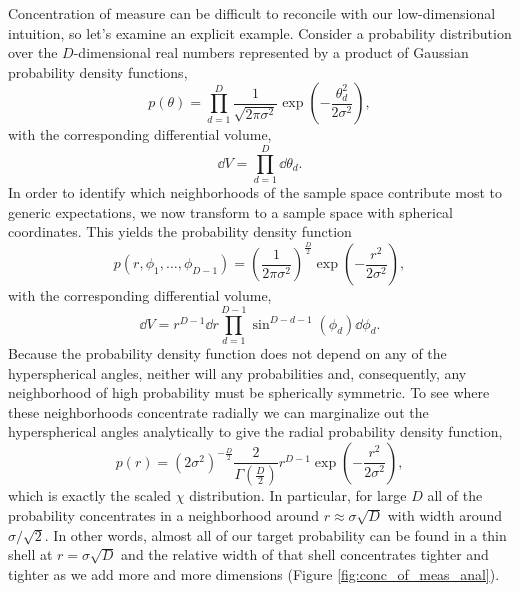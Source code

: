 Concentration of measure can be difficult to reconcile with our
low-dimensional intuition, so let's examine an explicit example.  Consider 
a probability distribution over the $D$-dimensional real numbers 
represented by a product of Gaussian probability density functions,
%
\begin{equation*}
p \! \left( \theta \right) = 
\prod_{d = 1}^{D} \frac{1}{\sqrt{2 \pi \sigma^{2} } }
\exp \! \left( - \frac{\theta_{d}^{2}}{2 \sigma^{2}} \right),
\end{equation*}
%
with the corresponding differential volume,
%
\begin{equation*}
\dd V = \prod_{d = 1}^{D} \dd \theta_{d}.
\end{equation*}
%
In order to identify which neighborhoods of the sample space contribute
most to generic expectations, we now transform to a sample space with 
spherical coordinates.  This yields the probability density function
%
\begin{equation*}
p \! \left( r, \phi_{1}, \ldots, \phi_{D - 1} \right) = 
\left( \frac{1}{2 \pi \sigma^{2} } \right)^{\frac{D}{2}}
\exp \! \left( - \frac{r^{2}}{2 \sigma^{2}} \right),
\end{equation*}
%
with the corresponding differential volume,
%
\begin{equation*}
\dd V = 
r^{D - 1} \dd r 
\prod_{d = 1}^{D - 1} \sin^{D - d - 1} \! \left( \phi_{d} \right) \dd \phi_{d}.
\end{equation*}
%
Because the probability density function does not depend on
any of the hyperspherical angles, neither will any probabilities
and, consequently, any neighborhood of high probability must be
spherically symmetric.  To see where these neighborhoods concentrate
radially we can marginalize out the hyperspherical angles analytically
to give the radial probability density function,
%
\begin{equation*}
p \! \left( r \right) = 
\left( 2 \sigma^{2} \right)^{-\frac{D}{2} }
\frac{ 2 }{ \Gamma \! \left( \frac{D}{2} \right) }
r^{D - 1} \exp \! \left( - \frac{r^{2}}{2 \sigma^{2}} \right),
\end{equation*}
%
which is exactly the scaled $\chi$ distribution.  In particular, for
large $D$ all of the probability concentrates in a neighborhood
around $r \approx \sigma \sqrt{D}$ with width around $\sigma / \sqrt{2}$.  
In other words, almost all of our target probability can be found in a 
thin shell at $r = \sigma \sqrt{D}$ and the relative width of that shell 
concentrates tighter and tighter as we add more and more dimensions 
(Figure \ref{fig:conc_of_meas_anal}).

